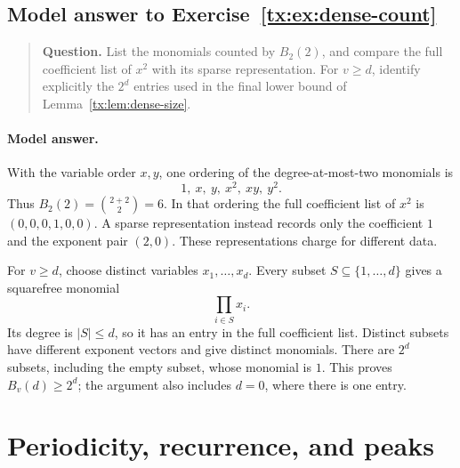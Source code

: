 \documentclass[11pt,a4paper,oneside,openany]{book}
\theoremstyle{definition}\newtheorem{definition}[theorem]{Definition}
\theoremstyle{remark}\newtheorem{remark}[theorem]{Remark}
\numberwithin{equation}{chapter}
\begin{document}
\begin{samepage}

\subsection*{Model answer to Exercise~\ref{tx:ex:dense-count}}\label{tx:ans:dense-count}

\begin{quote}\small\textbf{Question.} List the monomials counted by $B_2(2)$, and compare the full coefficient
list of $x^2$ with its sparse representation. For $v\ge d$, identify
explicitly the $2^d$ entries used in the final lower bound of
Lemma~\ref{tx:lem:dense-size}.
\end{quote}

\paragraph{Model answer.}
With the variable order \(x,y\), one ordering of the degree-at-most-two
monomials is
\[
                       1,\ x,\ y,\ x^2,\ xy,\ y^2.
\]
Thus \(B_2(2)=\binom{2+2}{2}=6\). In that ordering the full coefficient
list of \(x^2\) is \((0,0,0,1,0,0)\). A sparse representation instead
records only the coefficient \(1\) and the exponent pair \((2,0)\).
These representations charge for different data.
\end{samepage}

For \(v\ge d\), choose distinct variables \(x_1,\ldots,x_d\).
Every subset \(S\subseteq\{1,\ldots,d\}\) gives a squarefree monomial
\[
                            \prod_{i\in S}x_i.
\]
Its degree is \(|S|\le d\), so it has an entry in the full coefficient
list. Distinct subsets have different exponent vectors and give
distinct monomials. There are \(2^d\) subsets, including the empty
subset, whose monomial is \(1\). This proves \(B_v(d)\ge2^d\);
the argument also includes \(d=0\), where there is one entry.


\par


\section{Periodicity, recurrence, and peaks}
\end{document}

